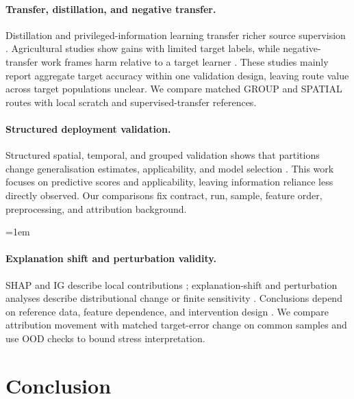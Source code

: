 \documentclass[runningheads]{venue/lncs/llncs}
\begin{document}
\paragraph{Transfer, distillation, and negative transfer.}
Distillation and privileged-information learning transfer richer source supervision \cite{Hinton2015Distillation,LopezPaz2016GeneralizedDistillation,Tian2020CRD}. Agricultural studies show gains with limited target labels, while negative-transfer work frames harm relative to a target learner \cite{Bohra2025KenyaTransfer,Niu2022TransferGapKD,Priyatikanto2023MaizeAdaptation,Wang2019NegativeTransfer}. These studies mainly report aggregate target accuracy within one validation design, leaving route value across target populations unclear. We compare matched GROUP and SPATIAL routes with local scratch and supervised-transfer references.

\paragraph{Structured deployment validation.}
Structured spatial, temporal, and grouped validation shows that partitions change generalisation estimates, applicability, and model selection \cite{Meyer2021AOA,Meyer2022MLMaps,Roberts2017StructuredCV}. This work focuses on predictive scores and applicability, leaving information reliance less directly observed. Our comparisons fix contract, run, sample, feature order, preprocessing, and attribution background.

\begingroup\emergencystretch=1em
\paragraph{Explanation shift and perturbation validity.}
SHAP and IG describe local contributions \cite{Lundberg2017SHAP,Sundararajan2017IntegratedGradients}; explanation-shift and perturbation analyses describe distributional change or finite sensitivity \cite{Kulinski2023ExplainingShift,Mougan2025ExplanationShift}. Conclusions depend on reference data, feature dependence, and intervention design \cite{Aas2021DependentSHAP,Hase2021OODExplainability,Hooker2019ROAR}. We compare attribution movement with matched target-error change on common samples and use OOD checks to bound stress interpretation.
\endgroup

\section{Conclusion}
\end{document}

